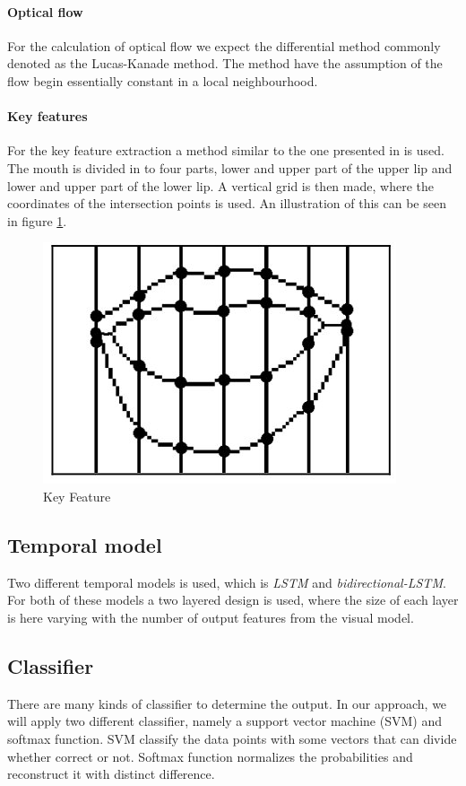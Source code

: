 \paragraph{Optical flow}
For the calculation of optical flow we expect the differential method commonly denoted as the Lucas-Kanade method\cite{Lucas1981}.
The method have the assumption of the flow begin essentially constant in a local neighbourhood.

\paragraph{Key features}
For the key feature extraction a method similar to the one presented in \cite{Li2008} is used.
The mouth is divided in to four parts, lower and upper part of the upper lip and lower and upper part of the lower lip.
A vertical grid is then made, where the coordinates of the intersection points is used.
An illustration of this can be seen in figure \ref{fig:keyFeature}.
\begin{figure}[h]
    \centering
    \includegraphics[width=0.5\columnwidth]{fig/keyFeature.jpg}
    \caption{Key Feature\cite{Li2008}}
    \label{fig:keyFeature}
\end{figure}

\subsection{Temporal model}
Two different temporal models is used, which is \textit{LSTM} and \textit{bidirectional-LSTM}.
For both of these models a two layered design is used, where the size of each layer is here varying with the number of output features from the visual model.

\subsection{Classifier}
There are many kinds of classifier to determine the output. In our approach, we will apply two different classifier, namely a support vector machine (SVM) and softmax function. SVM classify the data points with some vectors that can divide whether correct or not. Softmax function normalizes the probabilities and reconstruct it with distinct difference.

